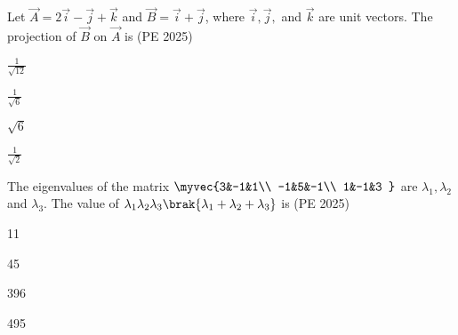 \item Let $\vec{A}=2\vec{i}-\vec{j}+\vec{k}$ and $\vec{B}=\vec{i}+\vec{j}$, where $\vec{i},\vec{j},$ and $\vec{k}$ are unit vectors. The projection of $\vec{B}$ on $\vec{A}$ is
\hfill{(PE 2025)}
\begin{enumerate}
\begin{multicols}{4}
    \item $\frac{1}{\sqrt{12}}$
    \item $\frac{1}{\sqrt{6}}$
    \item $\sqrt{6}$
    \item $\frac{1}{\sqrt{2}}$
\end{multicols}
\end{enumerate}
\item The eigenvalues of the matrix $\myvec{3&-1&1\\
-1&5&-1\\
1&-1&3
}$ are $\lambda_1,\lambda_2$ and $\lambda_3$.
The value of $\lambda_1\lambda_2\lambda_3\brak{\lambda_1+\lambda_2+\lambda_3}$ is
\hfill{(PE 2025)}
\begin{enumerate}
\begin{multicols}{4}
    \item 11
    \item 45
    \item 396
    \item 495
\end{multicols}
\end{enumerate}
